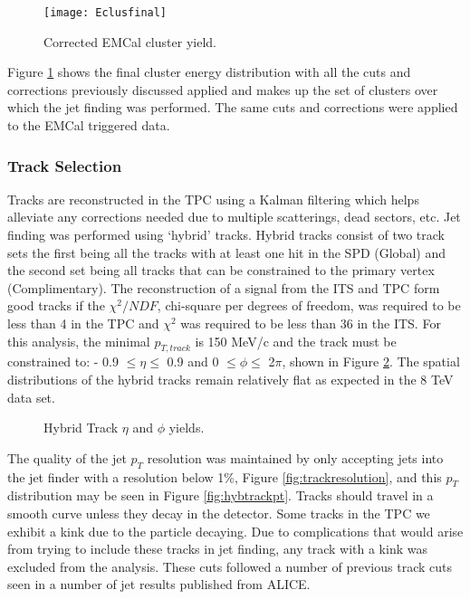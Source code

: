 \begin{figure}[h]
\texttt{[image: Eclusfinal]}
\centering
\caption{Corrected EMCal cluster yield.}
\label{fig:EMCalfinal}
\end{figure}
\newpage

Figure \ref{fig:EMCalfinal} shows the final cluster energy distribution with all the cuts and corrections previously discussed applied and makes up the set of clusters over which the jet finding was performed.  The same cuts and corrections were applied to the EMCal triggered data.

\subsubsection{Track Selection}

Tracks are reconstructed in the TPC using a Kalman filtering which helps alleviate any corrections needed due to multiple scatterings, dead sectors, etc.  Jet finding was performed using `hybrid' tracks.  Hybrid tracks consist of two track sets the first being all the tracks with at least one hit in the SPD (Global) and the second set being all tracks that can be constrained to the primary vertex (Complimentary).  The reconstruction of a signal from the ITS and TPC form good tracks if the $\chi^{2}/NDF$, chi-square per degrees of freedom, was required to be less than 4 in the TPC and $\chi^{2}$ was required to be less than 36 in the ITS. For this analysis, the minimal $p_{T, track}$ is 150 MeV/c and the track must be constrained to: - 0.9 $\leq \eta \leq$ 0.9 and 0 $\leq \phi \leq$ 2$\pi$, shown in Figure \ref{fig:Hybridtracketaphi}.  The spatial distributions of the hybrid tracks remain relatively flat as expected in the 8 TeV data set.

\begin{figure}%
    \centering
    \qquad
    \caption{Hybrid Track $\eta$ and $\phi$ yields.}%
    \label{fig:Hybridtracketaphi}%
\end{figure}

\noindent
The quality of the jet $p_{T}$ resolution was maintained by only accepting jets into the jet finder with a resolution below 1\%, Figure \ref{fig:trackresolution}, and this $p_{T}$ distribution may be seen in Figure \ref{fig:hybtrackpt}.  Tracks should travel in a smooth curve unless they decay in the detector.  Some tracks in the TPC we exhibit a kink due to the particle decaying.  Due to complications that would arise from trying to include these tracks in jet finding, any track with a kink was excluded from the analysis.  These cuts followed a number of previous track cuts seen in a number of jet results published from ALICE\cite{Acharya:2018eat}.

